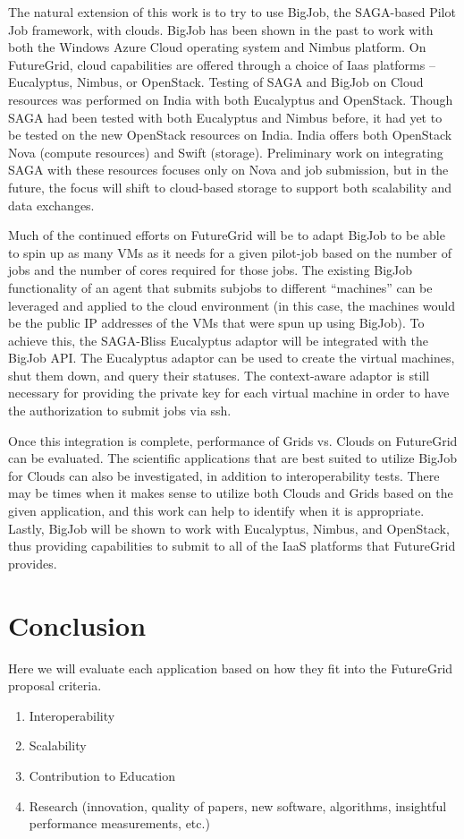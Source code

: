 \documentclass[]{paper}
\begin{document}
The natural extension of this work is to try to use BigJob, the SAGA-based Pilot Job framework, with clouds. BigJob has been shown in the past to work with both the Windows Azure Cloud operating system and Nimbus platform. On FutureGrid, cloud capabilities are offered through a choice of Iaas platforms -- Eucalyptus, Nimbus, or OpenStack. Testing of SAGA and BigJob on Cloud resources was performed on India with both Eucalyptus and OpenStack. Though SAGA had been tested with both Eucalyptus and Nimbus before, it had yet to be tested on the new OpenStack resources on India. India offers both OpenStack Nova (compute resources) and Swift (storage). Preliminary work on integrating SAGA with these resources focuses only on Nova and job submission, but in the future, the focus will shift to cloud-based storage to support both scalability and data exchanges.

Much of the continued efforts on FutureGrid will be to adapt BigJob to be able to spin up as many VMs as it needs for a given pilot-job based on the number of jobs and the number of cores required for those jobs. The existing BigJob functionality of an agent that submits subjobs to different ``machines'' can be leveraged and applied to the cloud environment (in this case, the machines would be the public IP addresses of the VMs that were spun up using BigJob). To achieve this, the SAGA-Bliss Eucalyptus adaptor will be integrated with the BigJob API. The Eucalyptus adaptor can be used to create the virtual machines, shut them down, and query their statuses. The context-aware adaptor is still necessary for providing the private key for each virtual machine in order to have the authorization to submit jobs via ssh.

Once this integration is complete, performance of Grids vs. Clouds on FutureGrid can be evaluated. The scientific applications that are best suited to utilize BigJob for Clouds can also be investigated, in addition to interoperability tests. There may be times when it makes sense to utilize both Clouds and Grids based on the given application, and this work can help to identify when it is appropriate. Lastly, BigJob will be shown to work with Eucalyptus, Nimbus, and OpenStack, thus providing capabilities to submit to all of the IaaS platforms that FutureGrid provides.


\section{Conclusion}
Here we will evaluate each application based on how they fit into the
FutureGrid proposal criteria.
\begin{enumerate}
\item Interoperability
\item Scalability
\item Contribution to Education
\item Research (innovation, quality of papers, new software, algorithms, insightful performance measurements, etc.)

\end{enumerate}
\end{document}
